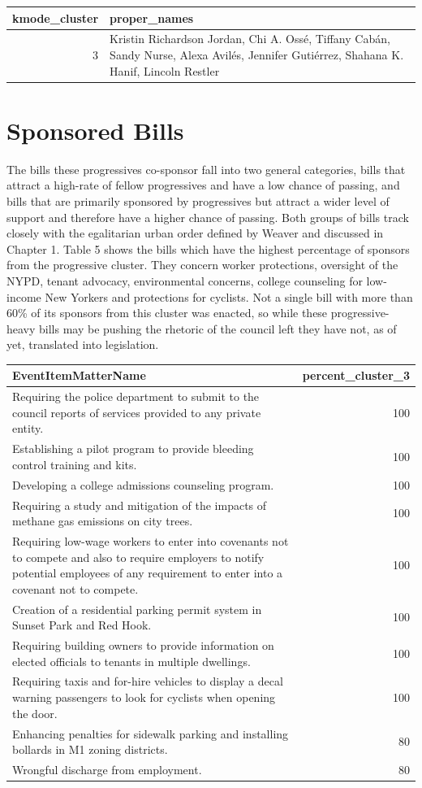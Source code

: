 \documentclass[
  letterpaper,
  DIV=11,
  numbers=noendperiod]{scrartcl}
\begin{document}
\begin{longtable}{rl}
\toprule
kmode\_cluster & proper\_names \\ 
\midrule
3 & Kristin Richardson Jordan, Chi A. Ossé, Tiffany Cabán, Sandy Nurse, Alexa Avilés, Jennifer Gutiérrez, Shahana K. Hanif, Lincoln Restler \\ 
\bottomrule
\end{longtable}

\hypertarget{sponsored-bills}{%
\section{Sponsored Bills}\label{sponsored-bills}}

The bills these progressives co-sponsor fall into two general
categories, bills that attract a high-rate of fellow progressives and
have a low chance of passing, and bills that are primarily sponsored by
progressives but attract a wider level of support and therefore have a
higher chance of passing. Both groups of bills track closely with the
egalitarian urban order defined by Weaver and discussed in Chapter 1.
Table 5 shows the bills which have the highest percentage of sponsors
from the progressive cluster. They concern worker protections, oversight
of the NYPD, tenant advocacy, environmental concerns, college counseling
for low-income New Yorkers and protections for cyclists. Not a single
bill with more than 60\% of its sponsors from this cluster was enacted,
so while these progressive-heavy bills may be pushing the rhetoric of
the council left they have not, as of yet, translated into legislation.

\begin{longtable}{lr}
\toprule
EventItemMatterName & percent\_cluster\_3 \\ 
\midrule
Requiring the police department to submit to the council reports of services provided to any private entity. & 100 \\ 
Establishing a pilot program to provide bleeding control training and kits. & 100 \\ 
Developing a college admissions counseling program. & 100 \\ 
Requiring a study and mitigation of the impacts of methane gas emissions on city trees. & 100 \\ 
Requiring low-wage workers to enter into covenants not to compete and also to require employers to notify potential employees of any requirement to enter into a covenant not to compete. & 100 \\ 
Creation of a residential parking permit system in Sunset Park and Red Hook. & 100 \\ 
Requiring building owners to provide information on elected officials to tenants in multiple dwellings. & 100 \\ 
Requiring taxis and for-hire vehicles to display a decal warning passengers to look for cyclists when opening the door. & 100 \\ 
Enhancing penalties for sidewalk parking and installing bollards in M1 zoning districts. & 80 \\ 
Wrongful discharge from employment. & 80 \\ 
\bottomrule
\end{longtable}
\end{document}
